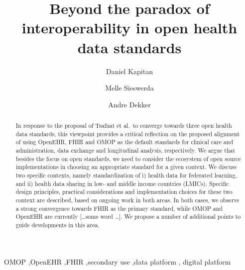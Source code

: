 \documentclass[
  authoryear]{elsarticle}
\begin{document}
\begin{frontmatter}
\title{Beyond the paradox of interoperability in open health data
standards}
\author[1,2,3]{Daniel Kapitan%
%
}
\author[4,5]{Melle Sieswerda%
%
}

\author[5]{Andre Dekker%
%
}






        
\begin{abstract}
In response to the proposal of Tsafnat et al.~to converge towards three
open health data standards, this viewpoint provides a critical
reflection on the proposed alignment of using OpenEHR, FHIR and OMOP as
the default standards for clinical care and administration, data
exchange and longitudinal analysis, respectively. We argue that besides
the focus on open standards, we need to consider the ecosystem of open
source implementations in choosing an appropriate standard for a given
context. We discuss two specific contexts, namely standardization of i)
health data for federated learning, and ii) health data sharing in low-
and middle income countries (LMICs). Specific design principles,
practical considerations and implementation choices for these two
context are described, based on ongoing work in both areas. In both
cases, we observe a strong convergence towards FHIR as the primary
standard, while OMOP and OpenEHR are currently {[}\ldots some word
\ldots{]}. We propose a number of additional points to guide
developments in this area.
\end{abstract}





\begin{keyword}
    OMOP \sep OpenEHR \sep FHIR \sep secondary use \sep data
platform \sep 
    digital platform
\end{keyword}
\end{frontmatter}
    
\end{document}
